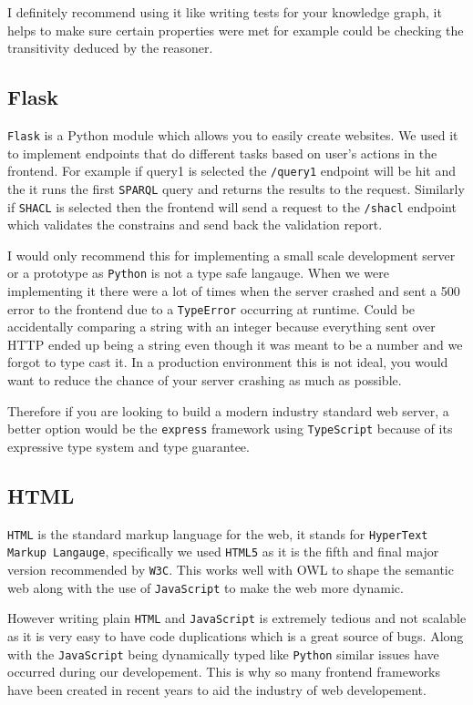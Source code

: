 \documentclass{article}
\begin{document}
I definitely recommend using it like writing tests for your knowledge graph, it helps to make sure certain properties were met for example could be checking the transitivity deduced by the reasoner.
\subsection*{Flask}
\verb|Flask| is a Python module which allows you to easily create websites. We used it to implement endpoints that do different tasks based on user's actions in the frontend. For example if query1 is selected the \verb|/query1| endpoint will be hit and the it runs the first \verb|SPARQL| query and returns the results to the request. Similarly if \verb|SHACL| is selected then the frontend will send a request to the \verb|/shacl| endpoint which validates the constrains and send back the validation report.

I would only recommend this for implementing a small scale development server or a prototype as \verb|Python| is not a type safe langauge. When we were implementing it there were a lot of times when the server crashed and sent a 500 error to the frontend due to a \verb|TypeError| occurring at runtime. Could be accidentally comparing a string with an integer because everything sent over HTTP ended up being a string even though it was meant to be a number and we forgot to type cast it. In a production environment this is not ideal, you would want to reduce the chance of your server crashing as much as possible.

Therefore if you are looking to build a modern industry standard web server, a better option would be the \verb|express| framework using \verb|TypeScript| because of its expressive type system and type guarantee.
\subsection*{HTML}
\verb|HTML| is the standard markup language for the web, it stands for \verb|HyperText Markup Langauge|, specifically we used \verb|HTML5| as it is the fifth and final major version recommended by \verb|W3C|. This works well with OWL to shape the semantic web along with the use of \verb|JavaScript| to make the web more dynamic.

However writing plain \verb|HTML| and \verb|JavaScript| is extremely tedious and not scalable as it is very easy to have code duplications which is a great source of bugs. Along with the \verb|JavaScript| being dynamically typed like \verb|Python| similar issues have occurred during our developement. This is why so many frontend frameworks have been created in recent years to aid the industry of web developement.
\end{document}
